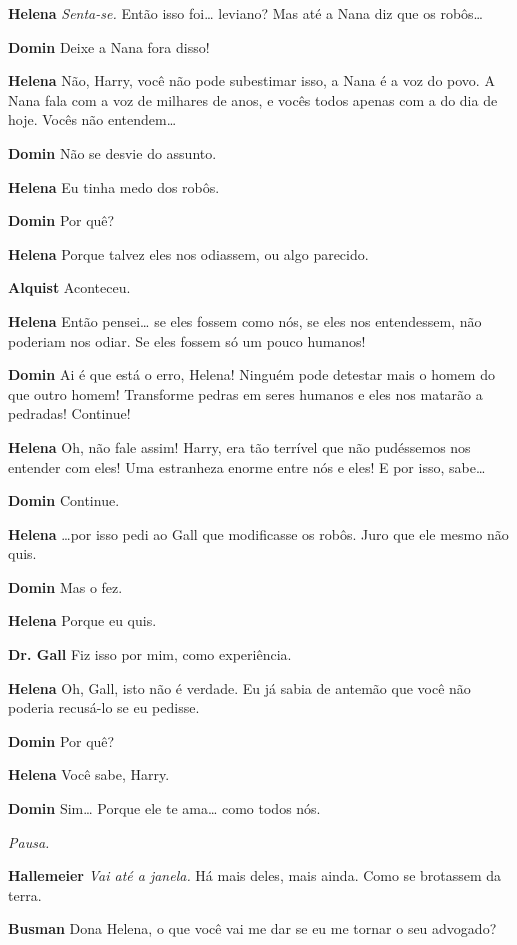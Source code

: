 \textbf{Helena} \emph{Senta-se.} Então isso foi\ldots{} leviano? Mas até a Nana diz
que os robôs\ldots{}

\textbf{Domin} Deixe a Nana fora disso!

\textbf{Helena} Não, Harry, você não pode subestimar isso, a Nana é a voz do povo. A
Nana fala com a voz de milhares de anos, e vocês todos apenas com a do dia de
hoje. Vocês não entendem\ldots{}

\textbf{Domin} Não se desvie do assunto.

\textbf{Helena} Eu tinha medo dos robôs.

\textbf{Domin} Por quê?

\textbf{Helena} Porque talvez eles nos odiassem, ou algo parecido.

\textbf{Alquist} Aconteceu.

\textbf{Helena} Então pensei\ldots{} se eles fossem como nós, se eles nos entendessem,
não poderiam nos odiar. Se eles fossem só um pouco humanos!

\textbf{Domin} Ai é que está o erro, Helena! Ninguém pode detestar mais o homem do que
outro homem! Transforme pedras em seres humanos e eles nos matarão a pedradas!
Continue!

\textbf{Helena} Oh, não fale assim! Harry, era tão terrível que não pudéssemos nos
entender com eles! Uma estranheza enorme entre nós e eles! E por isso, sabe\ldots{}

\textbf{Domin} Continue.

\textbf{Helena} \ldots{}por isso pedi ao Gall que modificasse os robôs. Juro que ele mesmo
não quis.

\textbf{Domin} Mas o fez.

\textbf{Helena} Porque eu quis.

\textbf{Dr. Gall} Fiz isso por mim, como experiência.

\textbf{Helena} Oh, Gall, isto não é verdade. Eu já sabia de antemão que você não
poderia recusá-lo se eu pedisse.

\textbf{Domin} Por quê?

\textbf{Helena} Você sabe, Harry.

\textbf{Domin} Sim\ldots{} Porque ele te ama\ldots{} como todos nós.

\emph{Pausa.}

\textbf{Hallemeier} \emph{Vai até a janela.} Há mais deles, mais ainda. Como se brotassem da terra.

\textbf{Busman} Dona Helena, o que você vai me dar se eu me tornar o seu advogado?

